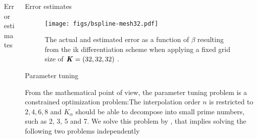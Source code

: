 \documentclass[final,hyperref={pdfpagelabels=false}]{beamer}
\begin{document}
\begin{frame}{}
\begin{columns}[t]
\begin{column}{.32\linewidth}
\begin{block}{\large Error estimates}
\begin{minipage}[c]{.975\linewidth}
        \end{minipage}
          \vspace{-0.4ex}
        \end{block}
      \end{column}
      \begin{column}{.32\linewidth}
        \vfill
        \begin{block}{\large Error estimates}
          \begin{minipage}[c]{.975\linewidth}
        \begin{figure}
          \texttt{[image: figs/bspline-mesh32.pdf]}
          \caption{The actual and estimated error as a
          function of $\beta$ resulting from the ik
          differentiation scheme when applying a fixed grid size of $\textbf{\textit{K}} = (32, 32, 32)$ .}  
        \end{figure} 
        \end{minipage}
        \end{block}
        \vfill
        \begin{block}{\large Parameter tuning}
          \vspace{1ex}
          \begin{minipage}[c]{.975\linewidth}
          From the mathematical point of view, the parameter tuning
          problem is a constrained optimization problem:The interpolation order $n$ is restricted to $ 2, 4, 6, 8$ and
          $K_\alpha$ should be able to decompose into small prime
          numbers, such as 2, 3, 5 and 7. We solve this problem by
          , that implies solving the following two
          problems independently 
\end{minipage}
\end{block}
\end{column}
\end{columns}
\end{frame}
\end{document}
